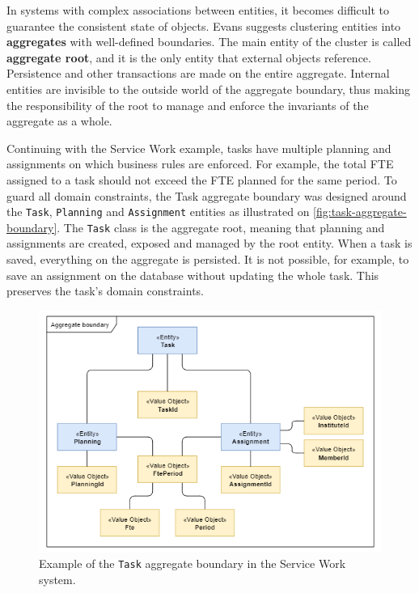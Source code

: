 In systems with complex associations between entities, it becomes difficult to guarantee the consistent state of objects. Evans \cite{ddd-blue-book} \cite{ddd-reference} suggests clustering entities into \textbf{aggregates} with well-defined boundaries. The main entity of the cluster is called \textbf{aggregate root}, and it is the only entity that external objects reference. Persistence and other transactions are made on the entire aggregate. Internal entities are invisible to the outside world of the aggregate boundary, thus making the responsibility of the root to manage and enforce the invariants of the aggregate as a whole.

Continuing with the Service Work example, tasks have multiple planning and assignments on which business rules are enforced. For example, the total FTE assigned to a task should not exceed the FTE planned for the same period. To guard all domain constraints, the Task aggregate boundary was designed around the \texttt{Task}, \texttt{Planning} and \texttt{Assignment} entities as illustrated on \autoref{fig:task-aggregate-boundary}. The \texttt{Task} class is the aggregate root, meaning that planning and assignments are created, exposed and managed by the root entity. When a task is saved, everything on the aggregate is persisted. It is not possible, for example, to save an assignment on the database without updating the whole task. This preserves the task's domain constraints.

\begin{figure}[htbp]
  \centering
  \includegraphics[scale=0.67]{Imagens/chap04/task-aggregate-boundary.png}
  \caption{Example of the \texttt{Task} aggregate boundary in the Service Work system.}
  \label{fig:task-aggregate-boundary}
\end{figure}


